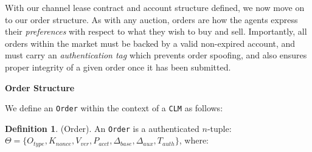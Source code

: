 \documentclass[10pt,a4paper]{article}
\theoremstyle{definition}
\newtheorem{definition}{Definition}[section]
\begin{document}
With our channel lease contract and account structure defined, we now move on
to our order structure. As with any auction, orders are how the agents express
their \emph{preferences} with respect to what they wish to buy and sell.
Importantly, all orders within the market must be backed by a valid non-expired
account, and must carry an \emph{authentication tag} which prevents order
spoofing, and also ensures proper integrity of a given order once it has been
submitted.

\begin{center}
\textbf{Order Structure}
\end{center}

We define an \texttt{Order} within the context of a \texttt{CLM} as follows:

\theoremstyle{definition}
\begin{definition}{(Order).}
    An \texttt{Order} is a authenticated $n$-tuple: \\ $\Theta = \{O_{type}, K_{nonce},
    V_{ver}, P_{acct}, \Delta_{base}, \Delta_{aux}, T_{auth} \} $, where:

\end{definition}
\end{document}
